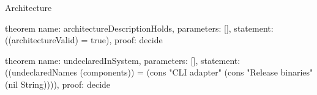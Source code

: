\begin{lexlean}{Architecture}
\begin{semanticmodule}
theorem{
  name: architectureDescriptionHolds,
  parameters: [],
  statement: ((architectureValid) = true),
  proof: decide{}
}

theorem{
  name: undeclaredInSystem,
  parameters: [],
  statement: ((undeclaredNames (components)) = (cons "CLI adapter" (cons "Release binaries" (nil String)))),
  proof: decide{}
}
\end{semanticmodule}
\end{lexlean}
